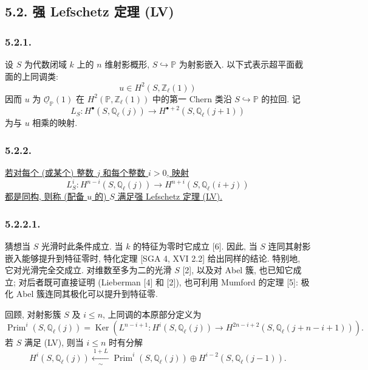 \subsection*{5.2. 强 Lefschetz 定理 (LV)}

\subsubsection*{5.2.1.}
设 $S$ 为代数闭域 $k$ 上的 $n$ 维射影概形, $S\hookrightarrow\mathbb P$ 为射影嵌入. 以下式表示超平面截面的上同调类:
\[
u\in H^2(S,\mathbb Z_\ell(1))
\]
因而 $u$ 为 $\underline{\mathcal O}_{\mathbb P}(1)$ 在 $H^2(\mathbb P,\mathbb Z_\ell(1))$ 中的第一 Chern 类沿 $S\hookrightarrow\mathbb P$ 的拉回. 记
\[
L_S:H^\bullet(S,\mathbb Q_\ell(j))
   \longrightarrow H^{\bullet+2}(S,\mathbb Q_\ell(j+1))
\]
为与 $u$ 相乘的映射.

\subsubsection*{5.2.2.}
\underline{若对每个 (或某个) 整数 $j$ 和每个整数 $i>0$, 映射}
\[
L_S^i:H^{n-i}(S,\mathbb Q_\ell(j))
\longrightarrow H^{n+i}(S,\mathbb Q_\ell(i+j))
\]
\underline{都是同构, 则称 (配备 $u$ 的) $S$ 满足强 Lefschetz 定理 (LV).}

\subsubsection*{5.2.2.1.}
猜想当 $S$ 光滑时此条件成立. 当 $k$ 的特征为零时它成立 [6]. 因此, 当 $S$ 连同其射影嵌入能够提升到特征零时, 特化定理 [SGA 4, XVI 2.2] 给出同样的结论. 特别地, 它对光滑完全交成立. 对维数至多为二的光滑 $S$ [2], 以及对 Abel 簇, 也已知它成立; 对后者既可直接证明 (Lieberman [4] 和 [2]), 也可利用 Mumford 的定理 [5]: 极化 Abel 簇连同其极化可以提升到特征零.

回顾, 对射影簇 $S$ 及 $i\leq n$, 上同调的本原部分定义为
\begin{equation}\tag{5.2.2.2}
\operatorname{Prim}^i(S,\mathbb Q_\ell(j))
=\operatorname{Ker}\!\left(
L^{n-i+1}:H^i(S,\mathbb Q_\ell(j))
\longrightarrow
H^{2n-i+2}(S,\mathbb Q_\ell(j+n-i+1))
\right).
\end{equation}
若 $S$ 满足 (LV), 则当 $i\leq n$ 时有分解
\begin{equation}\tag{5.2.2.3}
H^i(S,\mathbb Q_\ell(j))
\xleftarrow[\sim]{\ 1+L\ }
\operatorname{Prim}^i(S,\mathbb Q_\ell(j))
\oplus H^{i-2}(S,\mathbb Q_\ell(j-1)).
\end{equation}

